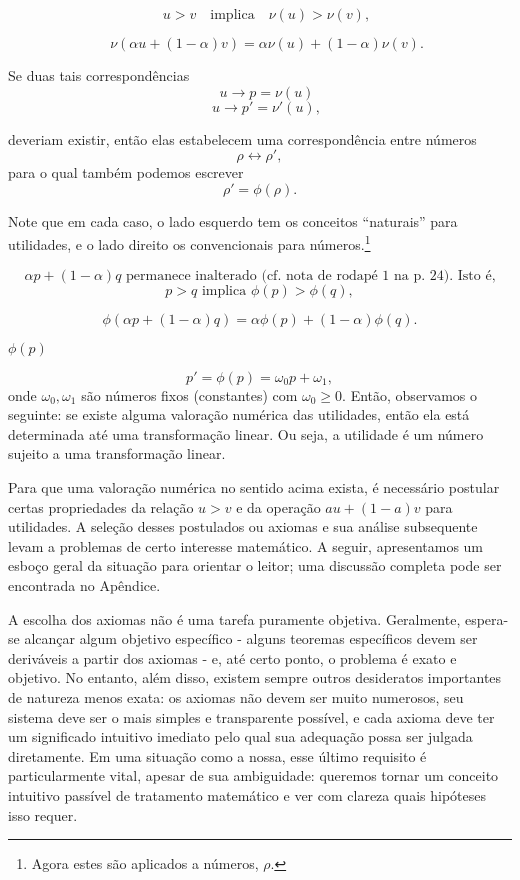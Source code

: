 \documentclass[a4paper,12pt]{article}[abntex2]
\begin{document}
$$
\quad u > v \quad \text{implica} \quad \nu(u) > \nu(v),
$$

$$
\quad \nu(\alpha u + (1 - \alpha)v) = \alpha \nu(u) + (1 - \alpha)\nu(v).
$$

Se duas tais correspondências
$$
\quad u \rightarrow p = \nu(u)
$$
$$
\quad u \rightarrow p' = \nu'(u),
$$

deveriam existir, então elas estabelecem uma correspondência entre números
\[ \rho \leftrightarrow \rho', \]
para o qual também podemos escrever
\[ \rho' = \phi(\rho). \]

Note que em cada caso, o lado esquerdo tem os conceitos ``naturais'' para utilidades, e o lado direito os convencionais para números.\footnote{Agora estes são aplicados a números, $\rho$.}

$$
\alpha p + (1 - \alpha)q \text{ permanece inalterado (cf. nota de rodapé 1 na p. 24). Isto é,}
$$
\begin{equation}
p > q \text{ implica } \phi(p) > \phi(q),
\end{equation}

\begin{equation}
\phi(\alpha p + (1 - \alpha)q) = \alpha \phi(p) + (1 - \alpha)\phi(q).
\end{equation}

 $\phi(p)$ 

\begin{equation}
p' = \phi(p) = \omega_0 p + \omega_1,
\end{equation}
onde $\omega_0, \omega_1$ são números fixos (constantes) com $\omega_0 \geq 0$.
Então, observamos o seguinte: se existe alguma valoração numérica das utilidades, então ela está determinada até uma transformação linear. Ou seja, a utilidade é um número sujeito a uma transformação linear.

Para que uma valoração numérica no sentido acima exista, é necessário postular certas propriedades da relação \(u > v\) e da operação \(au + (1 - a)v\) para utilidades. A seleção desses postulados ou axiomas e sua análise subsequente levam a problemas de certo interesse matemático. A seguir, apresentamos um esboço geral da situação para orientar o leitor; uma discussão completa pode ser encontrada no Apêndice.

A escolha dos axiomas não é uma tarefa puramente objetiva. Geralmente, espera-se alcançar algum objetivo específico - alguns teoremas específicos devem ser deriváveis a partir dos axiomas - e, até certo ponto, o problema é exato e objetivo. No entanto, além disso, existem sempre outros desideratos importantes de natureza menos exata: os axiomas não devem ser muito numerosos, seu sistema deve ser o mais simples e transparente possível, e cada axioma deve ter um significado intuitivo imediato pelo qual sua adequação possa ser julgada diretamente. Em uma situação como a nossa, esse último requisito é particularmente vital, apesar de sua ambiguidade: queremos tornar um conceito intuitivo passível de tratamento matemático e ver com clareza quais hipóteses isso requer.
\end{document}
